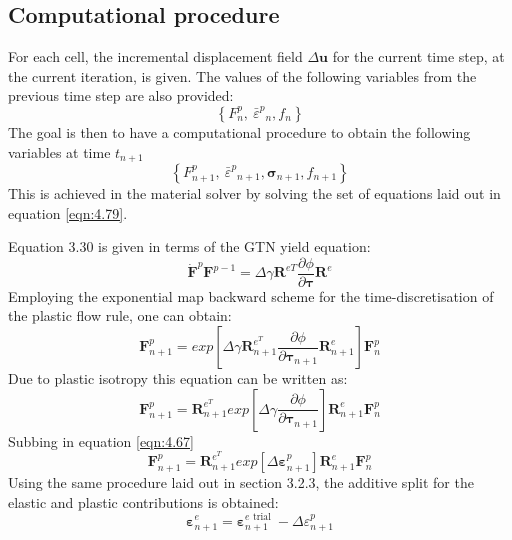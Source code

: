 \documentclass[sn-mathphys,Numbered,draft]{sn-jnl}%
\begin{document}
\subsection{Computational procedure}
For each cell, the incremental displacement field $\Delta\mathbf{u}$ for the current time step, at the current iteration, is given. The values of the following variables from the previous time step are also provided:
\begin{equation}
\left\{F_n^p,\ {{\bar{\varepsilon}}^p}_n,f_n\right\}
\end{equation}
The goal is then to have a computational procedure to obtain the following variables at time $t_{n+1}$
\begin{equation}
\left\{F_{n+1}^p,\ {{\bar{\varepsilon}}^p}_{n+1},\boldsymbol{\sigma}_{n+1},f_{n+1}\right\}
\end{equation}
This is achieved in the material solver by solving the set of equations laid out in equation \ref{eqn:4.79}.

Equation 3.30 is given in terms of the GTN yield equation:
\begin{equation}
	{\dot{\mathbf{F}}}^p\mathbf{F}^{p-1}=\Delta\gamma\mathbf{R}^{eT}\frac{\partial\phi}{\partial\boldsymbol{\tau}}\mathbf{R}^e
\end{equation}
Employing the exponential map backward scheme for the time-discretisation of the plastic flow rule, one can obtain:
\begin{equation}
	\mathbf{F}_{n+1}^p=exp\left[\Delta\gamma\mathbf{R}_{n+1}^{e^T}\frac{\partial\phi}{\partial\boldsymbol{\tau}_{n+1}}\mathbf{R}_{n+1}^e\right]\mathbf{F}_n^p
\end{equation}
Due to plastic isotropy this equation can be written as:
\begin{equation}
	\mathbf{F}_{n+1}^p=\mathbf{R}_{n+1}^{e^T}exp\left[\Delta\gamma\frac{\partial\phi}{\partial\boldsymbol{\tau}_{n+1}}\right]\mathbf{R}_{n+1}^e\mathbf{F}_n^p
\end{equation}
Subbing in equation \ref{eqn:4.67}
\begin{equation}	\mathbf{F}_{n+1}^p=\mathbf{R}_{n+1}^{e^T}exp\left[\Delta{\boldsymbol{\varepsilon}}^p_{n+1}\right]\mathbf{R}_{n+1}^e\mathbf{F}_n^p	
\end{equation}
Using the same procedure laid out in section 3.2.3, the additive split for the elastic and plastic contributions is obtained:
\begin{equation}
\boldsymbol{\varepsilon}_{n+1}^e=\boldsymbol{\varepsilon}_{n+1}^{e \text { trial }}-\Delta \varepsilon_{n+1}^p
\end{equation}
\end{document}
